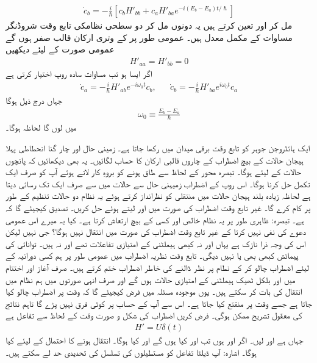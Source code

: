 \begin{align}
	\dot{c}_b=-\frac{i}{\hslash}\left[c_bH'_{bb}+c_aH'_{ba}e^{-i(E_b-E_a)t/\hslash}\right]
\end{align}
 مل کر  اور  تعین کرتے ہیں یہ دونوں مل کر دو سطحی نظامکی تابع وقت شروڈنگر مساوات کے مکمل معدل ہیں۔ عمومی طور پر  کے وتری ارکان قالب صفر ہوں گے عمومی صورت کے لیئے  دیکھیں
\begin{align}
	H'_{aa}=H'_{bb}=0
\end{align}
اگر ایسا ہو تب مساوات سادہ روپ اختیار کرتی ہے
\begin{align}
	\dot{c}_a=-\frac{i}{\hslash}H'_{ab}e^{-i\omega_0t}c_b,&&\dot{c}_b=-\frac{i}{\hslash}H'_{ba}e^{i\omega_0t}c_a
\end{align}
جہاں درج ذیل ہوگا
\begin{align}
	\omega_0\equiv\frac{E_b-E_a}{\hslash}
\end{align}
میں  لوں گا لحاظہ  ہوگا۔


ایک ہائڈروجن جوہر کو تابع وقت برقی میدان  میں رکھا جاتا ہے۔ زمینی حال  اور چار گنا انحطاطی پہلا ہیجان حالات  کے بیچ اضطراب  کے چاروں قالبی ارکان  کا حساب لگائیں۔ یہ بھی دیکھائیں کہ پانچوں حالات کے لیئے  ہوگا۔ تبصرہ محور  کے لحاظ سے طاق ہونے کو بروہِ کار لاتے ہوئے آپ کو صرف ایک تکمل حل کرنا ہوگا۔ اس روپ کے اضطراب زمیہنی حال سے  حالات میں سے صرف ایک تک رسائی دیتا ہے لحاظہ زیادہ بلند ہیجان حالات میں منتقلی کو نظرانداز کرتے ہوئے یہ نظام دو حالات تنظیم کے طور پر کام کرے گا۔
غیر تابع وقت اضطراب کی صورت میں  اور  لیتے ہوئے  حل کریں۔ تصدیق کیجیئے گا کہ  ہے۔ تبصرہ: ظاہری طور پر یہ نظام خالص  اور کسی  کے بیچ ارتعاش کرتا ہے۔ کیا یہ میرے اس عمومی دعوے کی نفی نہیں کرتا کے غیر تابع وقت اضطراب کی صورت میں انتقال نہیں ہوگا؟ جی نہیں لیکن اس کی وجہ ذرا نازک ہے یہاں  اور  نہ کبھی ہیملٹنی کے امتیازی تفاعلات تھے اور نہ ہیں۔ توانائی کی پیمائش کبھی بھی  یا  نہیں دیگی۔ تابع وقت نظریہ اضطراب میں عمومی طور پر ہم کسی دورانیہ کے لیئے اضطراب چالو کر کے نطام پر نظر ڈالنے کی خاطر اضطراب ختم کرتے ہیں۔ صرف آغاز اور اختتام میں  اور  بلکل ٹھیک ہیملٹنی کے امتیازی حالات ہوں گے اور صرف انہی صورتوں میں ہم نظام میں انتقال کی بات کر سکتے ہیں۔ یوں موجودہ مسئلہ میں فرض کیجیئے گا کہ وقت  پر اضطراب چالو کیا جاتا ہے جسے وقت  پر منقتع کیا جاتا ہے۔ اس سے آپ کے حساب پر کوئی فرق نہیں پڑے گا تاہم نتائج کی معقول تشریح ممکن ہوگی۔
فرض کریں اضطراب کی شکل و صورت وقت کے لحاظ سے  تفاعل ہے
\begin{align*}
	H'=U\delta(t)
\end{align*}
جہاں  ہے اور  لیں۔ اگر  اور  ہوں تب  اور  کیا ہوں گے اور کیا  ہوگا۔ انتقال ہونے کا احتمال  کے لیئے  کیا ہوگا۔ اشارہ: آپ ڈیلٹا تفاعل کو مستطیلوں کی تسلسل کی تحدیدی حد لے سکتے ہیں۔

